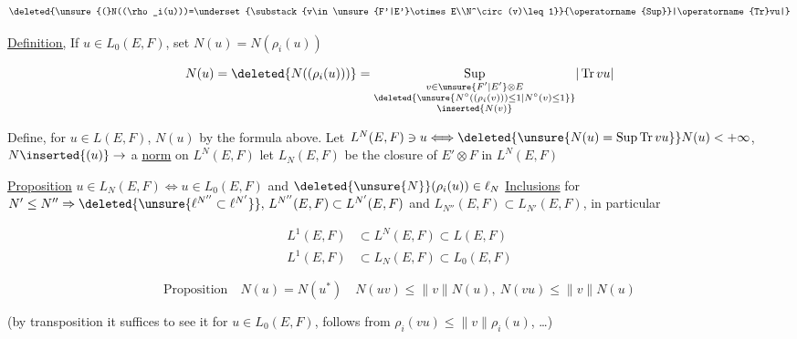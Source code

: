 \[
\deleted{\unsure{(}N((\rho_i(u)))=\underset{\substack{v\in\unsure{F'|E'}\otimes E\\N^\circ(v)\leq 1}}{\operatorname{Sup}}|\operatorname{Tr}vu|}
\]

\uline{Definition,} If $u\in L_0(E,F)$, set $N(u)=N(\rho_i(u))$

\[
N(u)=\deleted{N((\rho_i(u)))}=\underset{\substack{v\in\unsure{F'|E'}\otimes E\\\deleted{\unsure{N^\circ((\rho_i(v)))\leq 1|N^\circ(v)\leq1}}\\\inserted{N(v)}}}{\operatorname{Sup}}|\operatorname{Tr}vu|
\]

Define, for $u\in L(E,F)$, $N(u)$ by the formula above. Let $L^N(E,F)\ni u\Longleftrightarrow\deleted{\unsure{N(u)=\operatorname{Sup}\operatorname{Tr}vu}}N(u)<+\infty$, $N\inserted{(u)}\to$ a \uline{norm} on $L^N(E,F)$  let $L_N(E,F)$ be the closure of $E'\otimes F$ in $L^N(E,F)$

 \uline{Proposition} $u\in L_N(E,F)\Longleftrightarrow u\in L_0(E,F)$ and $\deleted{\unsure{N}}(\rho_i(u))\in\ell_N$   \uline{Inclusions} for $N'\leq N''\Rightarrow\deleted{\unsure{\ell^{N''}\subset\ell^{N'}}},\,L^{N''}(E,F)\subset L^{N'}(E,F)$ and $L_{N''}(E,F)\subset L_{N'}(E,F)$, in particular

\[
\begin{aligned}
L^1(E,F)&\subset L^N(E,F)\subset L(E,F)\\
L^1(E,F)&\subset L_N(E,F)\subset L_0(E,F)
\end{aligned}
\]


\[
\text{Proposition}\quad\boxed{N(u)=N(u^*)\quad N(uv)\leq\lVert v\rVert N(u),\ N(vu)\leq\lVert v\rVert N(u)}
\]

 (by transposition it suffices to see it for $u\in L_0(E,F)$,  follows from $\rho_i(vu)\leq\lVert v\rVert\rho_i(u)$, \ldots)


